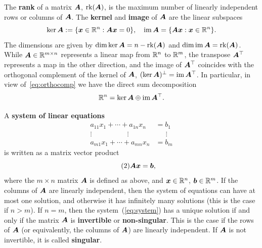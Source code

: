 The \strictpagecheck{}\textbf{rank} of a matrix $\bm{A}$, $\mathrm{rk}(\bm{A})$, is the maximum number of linearly independent rows or columns of $\bm{A}$. The \textbf{kernel} and \textbf{image} of $\bm{A}$ are the linear subspaces
\begin{equation*}
 \ker \bm{A} := \{\bm{x}\in \mathbb{R}^n \mathrel{\mathop{:}} \bm{A}\bm{x}=0\}, \quad \operatorname{im} \bm{A} = \{\bm{A}\bm{x} \mathrel{\mathop{:}} \bm{x}\in \mathbb{R}^n\}.
\end{equation*}
The dimensions are given by $\dim \ker{\bm{A}} = n-\mathrm{rk}(\bm{A})$ and $\dim \operatorname{im} \bm{A} = \mathrm{rk}(\bm{A})$. While $\bm{A}\in \mathbb{R}^{m\times n}$ represents a linear map from $\mathbb{R}^n$ to $\mathbb{R}^m$, the transpose $\bm{A}^{\top}$ represents a map in the other direction, and the image of $\bm{A}^{\top}$ coincides with the orthogonal complement of the kernel of $\bm{A}$, $(\ker \bm{A})^{\perp} = \operatorname{im} \bm{A}^{\top}$. In particular, in view of~\eqref{eq:orthocomp} we have the direct sum decomposition
\begin{equation*}
 \mathbb{R}^n = \ker \bm{A} \oplus \operatorname{im} \bm{A}^{\top}.
\end{equation*}

A \textbf{system of linear equations}
\begin{align*}
  a_{11} x_1 + \cdots +a_{1n}x_n &= b_1\\
   \vdots \quad\quad\quad\quad\quad \vdots \quad \ \  & \quad \ \ \vdots\\
  a_{m1} x_1 + \cdots +a_{mn}x_n &= b_m
\end{align*}
is written as a matrix vector product
\begin{equation}\label{eq:system}\tag{2}
  \bm{A}\bm{x} = \bm{b},
\end{equation}
where the $m\times n$ matrix $\bm{A}$ is defined as above, and 
$\bm{x}\in \mathbb{R}^n$, $\bm{b}\in \mathbb{R}^m$. If the columns of $\bm{A}$ are linearly independent, then the system of equations can have at most one solution, and otherwise it has infinitely many solutions (this is the case if $n>m$).
If $n=m$, then the system~(\ref{eq:system}) has a unique solution
if and only if the matrix $\bm{A}$ is \textbf{invertible} or \textbf{non-singular}. This is the case if the rows of $\bm{A}$ (or equivalently, the columns of $\bm{A}$) are linearly independent.
If $\bm{A}$ is not invertible, it is called \textbf{singular}.

